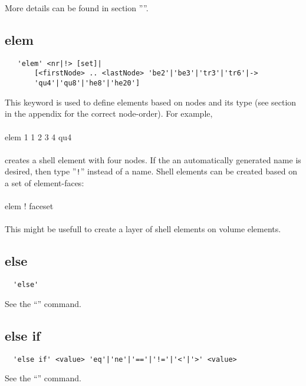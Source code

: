 \documentclass{article}
\begin{document}
More details can be found in section ''''.

\subsection{\label{elem}elem}
\begin{verbatim}
   'elem' <nr|!> [set]|
       [<firstNode> .. <lastNode> 'be2'|'be3'|'tr3'|'tr6'|->
       'qu4'|'qu8'|'he8'|'he20']
\end{verbatim}
This keyword is used to define elements based on nodes and its type (see section  in the appendix for the correct node-order). For example,\\\\
elem 1 1 2 3 4 qu4\\\\creates a shell element with four nodes. If the an automatically generated name is desired, then type ''\verb_!_'' instead of a name. Shell elements can be created based on a set of element-faces:\\\\elem ! faceset\\\\This might be usefull to create a layer of shell elements on volume elements. 

\subsection{\label{else}else}
\begin{verbatim}
  'else'
\end{verbatim}
See the ``'' command.

\subsection{\label{else if}else if}
\begin{verbatim}
  'else if' <value> 'eq'|'ne'|'=='|'!='|'<'|'>' <value>
\end{verbatim}
See the ``'' command.
\end{document}
